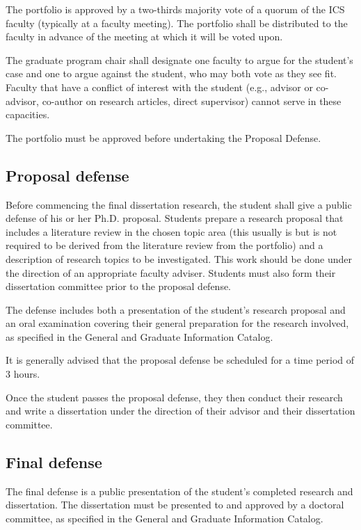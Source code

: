 \documentclass[12pt]{article}
\begin{document}
The portfolio is approved by a two-thirds majority vote of a quorum of the ICS faculty (typically at a faculty meeting). The portfolio shall be distributed to the faculty in advance of the meeting at which it will be voted upon.

The graduate program chair shall designate one faculty to argue for the student's case and one to argue against the student, who may both vote as they see fit. Faculty that have a conflict of interest with the student (e.g., advisor or co-advisor, co-author on research articles, direct supervisor) cannot serve in these capacities.

The portfolio must be approved before undertaking the Proposal Defense.

\subsection{Proposal defense}

Before commencing the final dissertation research, the student shall give a
public defense of his or her Ph.D. proposal. Students prepare a research
proposal that includes a literature review in the chosen topic area (this
usually is but is not required to be derived from the literature review
from the portfolio) and a description of research topics to be
investigated. This work should be done under the direction of an
appropriate faculty adviser.  Students must also form their dissertation
committee prior to the proposal defense.

The defense includes both a presentation of the student's research
proposal and an oral examination covering their general preparation for the
research involved, as specified in the General and Graduate Information
Catalog.

It is generally advised that the proposal defense be scheduled for a time period of 3 hours. 

Once the student passes the proposal defense, they then conduct their
research and write a dissertation under the direction of their advisor and
their dissertation committee.

\subsection{Final defense}

The final defense is a public presentation of the student's completed
research and dissertation.  The dissertation must be presented to and
approved by a doctoral committee, as specified in the General and Graduate
Information Catalog.
\end{document}
